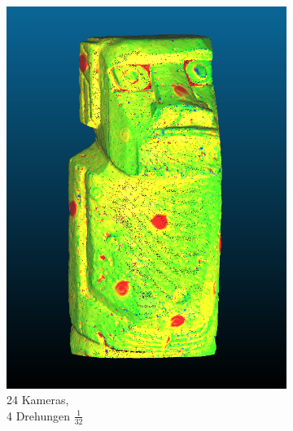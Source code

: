 \documentclass[./00PhotoBox.tex]{subfiles}
\begin{document}
\begin{figure}
\begin{subfigure}{0.24\textwidth}
        \includegraphics[width=1\linewidth]{img/cam_anzahl/feinschritt.png}
        \centering
        \caption{24 Kameras,\\4 Drehungen $\frac{1}{32}$} %
        \label{img:moai_feinschritt} %
    \end{subfigure}
    \begin{subfigure}{0.24\textwidth}

\end{subfigure}
\end{figure}
\end{document}
